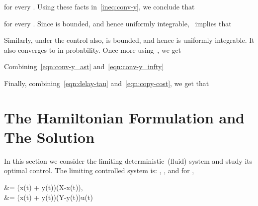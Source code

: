 \documentclass[10pt,journal,letterpaper]{IEEEtran}
\newcommand{\remove}[1]{}
\begin{document}
for every . Using these facts in~\eqref{ineq:conv-y}, we conclude that

for every . Since  is bounded, and hence uniformly integrable,~\cite[Theorem~9.5.1]{stochproc.measure-and-probability}
implies that

Similarly, under the control  also,  is bounded, and hence is uniformly integrable. It
also converges to   in probability. Once more using~\cite[Theorem~9.5.1]{stochproc.measure-and-probability}, we get

Combining~\eqref{eqn:conv-y_ast} and~\eqref{eqn:conv-y_infty}

Finally, combining~\eqref{eqn:delay-tau} and~\eqref{eqn:copy-cost}, we get that



\remove{


Recall the definition of  in~\eqref{eqn:tau-K}. Also, define

Then, for the optimal policy ,

where as for the deterministic policy ,

For any , it is already shown that

and it can be easily shown that

Since under both the controls,  and , the random variable   has finite mean
and second moment, we conclude that

Next, let us consider the uncontrolled dynamics of the number of infected relays.
Following Lemma~\ref{epsi-delta}, for every ,

Since, the random variables  and  are bounded,
we get

Observe that   and
. Thus

Finally, combining~\eqref{eqn:delay-tau} and~\eqref{eqn:copy-cost}, we get that

}

\section{The Hamiltonian Formulation and The Solution}
\label{hamiltonian}

In this section we consider the limiting deterministic~(fluid) system  
and study its optimal control.
The limiting controlled system is: , , and for ,

 &= \Lambda (x(t) + y(t))(X-x(t)), \label{controlled-drift-1}\\
 &=  \Lambda (x(t) + y(t))(Y-y(t))u(t) \label{controlled-drift-2}\
\end{document}
